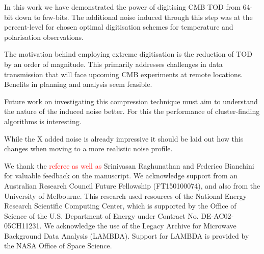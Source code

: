 \documentclass[apj]{emulateapj}
\newcommand{\changed}[1]{\textcolor{Red}{#1}}
\begin{document}
In this work we have demonstrated the power of digitising CMB TOD from 64-bit down to few-bits. The additional noise induced through this step was at the percent-level for chosen optimal digitisation schemes for temperature and polarisation observations.

The motivation behind employing extreme digitisation is the reduction of TOD by an order of magnitude. This primarily addresses challenges in data transmission that will face upcoming CMB experiments at remote locations. Benefits in planning and analysis seem feasible.

Future work on investigating this compression technique must aim to understand the nature of the induced noise better. For this the performance of cluster-finding algorithms is interesting.

While the X added noise is already impressive it should be laid out how this changes when moving to a more realistic noise profile.

\acknowledgments

We thank the \changed{referee as well as} Srinivasan Raghunathan and Federico Bianchini for valuable feedback on the manuscript. 
We acknowledge support from an Australian Research Council Future Fellowship (FT150100074), and also from the University of Melbourne. 
This research used resources of the National Energy Research Scientific Computing Center, which is supported by the Office of Science of the U.S. Department of Energy under Contract No. DE-AC02-05CH11231. 
We acknowledge the use of the Legacy Archive for Microwave Background Data Analysis (LAMBDA). Support for LAMBDA is provided by the NASA Office of Space Science.



\end{document}
